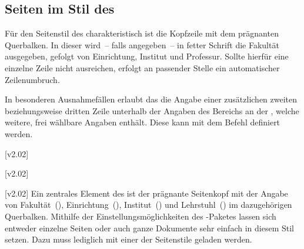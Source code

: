\begin{DeclareEntity*}{}
\begin{DeclareEntity*}{}
\begin{DeclareEntity*}{}
\subsection{%
  Seiten im Stil des \CDs%
  \label{sec:tudheadings}%
}
%
\begin{Declaration}
  {}
\begin{Declaration}
  {}
\begin{Declaration}
  {}
\begin{Declaration}
  {}
\begin{Declaration}
  {}
Für den Seitenstil des \TUDCDs charakteristisch ist die Kopfzeile mit dem 
prägnanten Querbalken. In dieser wird~-- falls angegeben~-- in fetter Schrift 
die Fakultät ausgegeben, gefolgt von Einrichtung, Institut und Professur. 
Sollte hierfür eine einzelne Zeile nicht ausreichen, erfolgt an passender 
Stelle ein automatischer Zeilenumbruch.

In besonderen Ausnahmefällen erlaubt das \CD die Angabe einer zusätzlichen
zweiten beziehungsweise dritten Zeile unterhalb der Angaben des Bereichs an der 
\TnUD, welche weitere, frei wählbare Angaben enthält. Diese kann mit dem Befehl 
 definiert werden.
\end{Declaration}
\end{Declaration}
\end{Declaration}
\end{Declaration}
\end{Declaration}
%
\begin{Declaration}
  {}
  [v2.02]
\begin{Declaration}
  {}
  [v2.02]
\begin{Declaration}
  {}
  [v2.02]
%
Ein zentrales Element des \TUDCDs ist der prägnante Seitenkopf mit der Angabe 
von Fakultät~(), Einrichtung~(), 
Institut~() und Lehrstuhl~() im dazugehörigen 
Querbalken. Mithilfe der Einstellungsmöglichkeiten des \KOMAScript-Paketes 
 lassen sich entweder einzelne Seiten oder auch ganze 
Dokumente sehr einfach in diesem Stil setzen. Dazu muss lediglich mit 
 einer der Seitenstile geladen werden. 


\end{Declaration}
\end{Declaration}
\end{Declaration}
\end{DeclareEntity*}
\end{DeclareEntity*}
\end{DeclareEntity*}
